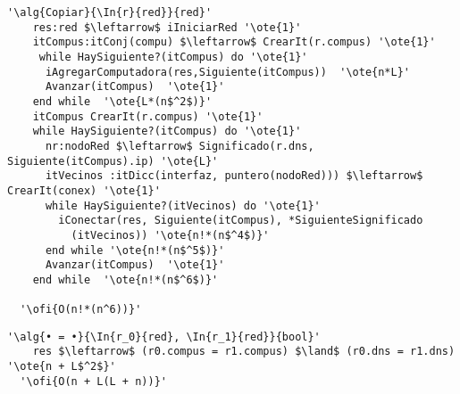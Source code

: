 \begin{lstlisting}[mathescape]
'\alg{Copiar}{\In{r}{red}}{red}'
    res:red $\leftarrow$ iIniciarRed '\ote{1}'
    itCompus:itConj(compu) $\leftarrow$ CrearIt(r.compus) '\ote{1}'
     while HaySiguiente?(itCompus) do '\ote{1}'
      iAgregarComputadora(res,Siguiente(itCompus))  '\ote{n*L}'
      Avanzar(itCompus)  '\ote{1}'
    end while  '\ote{L*(n$^2$)}'
    itCompus CrearIt(r.compus) '\ote{1}'
    while HaySiguiente?(itCompus) do '\ote{1}'
      nr:nodoRed $\leftarrow$ Significado(r.dns, Siguiente(itCompus).ip) '\ote{L}'
      itVecinos :itDicc(interfaz, puntero(nodoRed))) $\leftarrow$ CrearIt(conex) '\ote{1}'
      while HaySiguiente?(itVecinos) do '\ote{1}'
        iConectar(res, Siguiente(itCompus), *SiguienteSignificado
          (itVecinos)) '\ote{n!*(n$^4$)}'
      end while '\ote{n!*(n$^5$)}'
      Avanzar(itCompus)  '\ote{1}'
    end while  '\ote{n!*(n$^6$)}'

  '\ofi{O(n!*(n^6))}'
\end{lstlisting}

\begin{lstlisting}[mathescape]
'\alg{• = •}{\In{r_0}{red}, \In{r_1}{red}}{bool}'
    res $\leftarrow$ (r0.compus = r1.compus) $\land$ (r0.dns = r1.dns) '\ote{n + L$^2$}'
  '\ofi{O(n + L(L + n))}'
\end{lstlisting}
